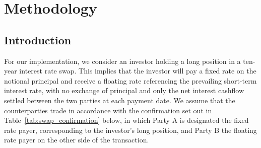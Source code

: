 \chapter{Methodology}

\section{Introduction}
\label{sec:methodology_intro}

  For our implementation, we consider an investor holding a long position in a ten-year interest rate swap. This implies that the investor will pay a fixed rate on the notional principal and receive a floating rate referencing the prevailing short-term interest rate, with no exchange of principal and only the net interest cashflow settled between the two parties at each payment date. We assume that the counterparties trade in accordance with the confirmation set out in Table~\ref{tab:swap_confirmation} below, in which Party A is designated the fixed rate payer, corresponding to the investor's long position, and Party B the floating rate payer on the other side of the transaction. \\


